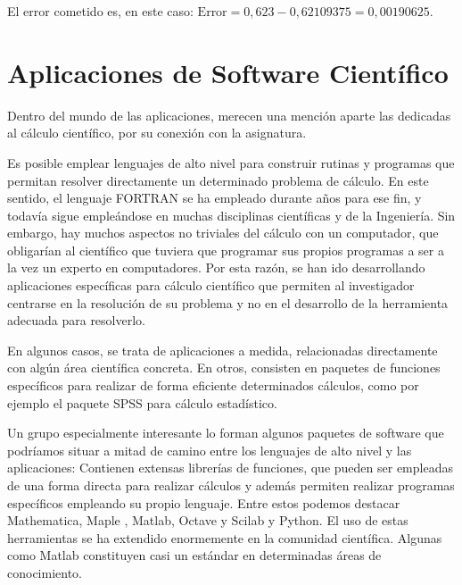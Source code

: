 El error cometido es, en este caso: $\text{Error}=0,623-0,62109375=0,00190625$.
  
 \section{Aplicaciones de Software Científico}
Dentro del mundo de las aplicaciones, merecen una mención aparte las dedicadas al cálculo científico, por su conexión con la asignatura. 

Es posible emplear lenguajes de alto nivel para construir rutinas y programas que permitan resolver directamente un determinado problema de cálculo. En este sentido, el lenguaje FORTRAN se ha empleado durante años para ese fin, y todavía sigue empleándose en muchas disciplinas científicas y de la Ingeniería.  Sin embargo, hay muchos aspectos no triviales del cálculo con un computador, que obligarían al científico que tuviera que programar sus propios programas a ser a la vez un experto en computadores.  Por esta razón, se han ido desarrollando aplicaciones específicas para cálculo científico que permiten al investigador centrarse en la resolución de su problema y no en el desarrollo de la herramienta adecuada para resolverlo.  
 
En algunos casos, se trata de aplicaciones a medida, relacionadas directamente con algún área científica concreta. En otros, consisten en paquetes de funciones específicos para realizar de forma eficiente determinados cálculos, como por ejemplo
el paquete SPSS para cálculo estadístico.

Un grupo especialmente interesante lo forman algunos paquetes de software que podríamos situar a mitad de camino entre los lenguajes de alto nivel y las aplicaciones: Contienen extensas librerías de funciones, que pueden ser empleadas de una forma directa para realizar cálculos y además permiten realizar programas específicos empleando su propio lenguaje. Entre estos podemos destacar Mathematica, Maple , Matlab, Octave y Scilab y Python. El uso de estas herramientas se ha extendido enormemente en la comunidad científica. Algunas como Matlab  constituyen casi un estándar en determinadas áreas de conocimiento.

 


    

 

  
